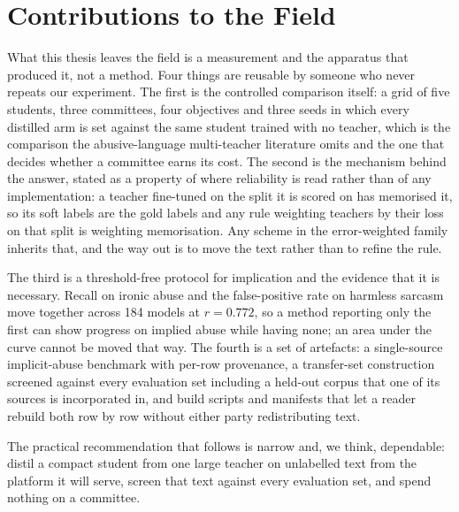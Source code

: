 \section{Contributions to the Field}
\label{sec:6.contrib}

What this thesis leaves the field is a measurement and the apparatus that produced it, not a method.
Four things are reusable by someone who never repeats our experiment. The first is the controlled
comparison itself: a grid of five students, three committees, four objectives and three seeds in which
every distilled arm is set against the same student trained with no teacher, which is the comparison
the abusive-language multi-teacher literature omits and the one that decides whether a committee earns
its cost. The second is the mechanism behind the answer, stated as a property of where reliability is
read rather than of any implementation: a teacher fine-tuned on the split it is scored on has
memorised it, so its soft labels are the gold labels and any rule weighting teachers by their loss on
that split is weighting memorisation. Any scheme in the error-weighted family inherits that, and the
way out is to move the text rather than to refine the rule.

The third is a threshold-free protocol for implication and the evidence that it is necessary. Recall
on ironic abuse and the false-positive rate on harmless sarcasm move together across 184 models at
$r = 0.772$, so a method reporting only the first can show progress on implied abuse while having
none; an area under the curve cannot be moved that way. The fourth is a set of artefacts: a
single-source implicit-abuse benchmark with per-row provenance, a transfer-set construction screened
against every evaluation set including a held-out corpus that one of its sources is incorporated in,
and build scripts and manifests that let a reader rebuild both row by row without either party
redistributing text.

The practical recommendation that follows is narrow and, we think, dependable: distil a compact
student from one large teacher on unlabelled text from the platform it will serve, screen that text
against every evaluation set, and spend nothing on a committee.


